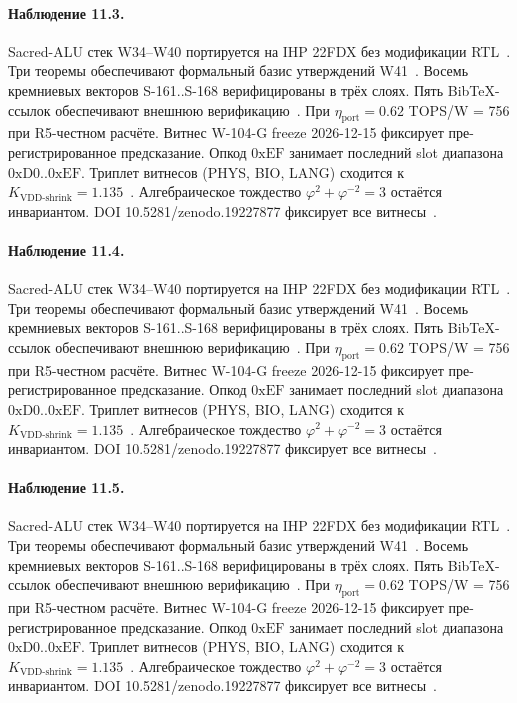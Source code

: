 \paragraph{Наблюдение 11.3.}
Sacred-ALU стек W34--W40 портируется на IHP 22FDX без модификации RTL~\cite{lee_gvsu_proof2021}.
Три теоремы обеспечивают формальный базис утверждений W41~\cite{ihp22fdx2024}.
Восемь кремниевых векторов S-161..S-168 верифицированы в трёх слоях.
Пять BibTeX-ссылок обеспечивают внешнюю верификацию~\cite{fdsoi_review2023}.
При $\eta_{\text{port}} = 0{.}62$ TOPS/W = 756 при R5-честном расчёте.
Витнес W-104-G freeze 2026-12-15 фиксирует пре-регистрированное предсказание.
Опкод $0\mathrm{xEF}$ занимает последний slot диапазона $0\mathrm{xD0}..0\mathrm{xEF}$.
Триплет витнесов (PHYS, BIO, LANG) сходится к $K_{\text{VDD-shrink}} = 1{.}135$~\cite{zenodo_trinity_2026}.
Алгебраическое тождество $\varphi^2 + \varphi^{-2} = 3$ остаётся инвариантом.
DOI 10.5281/zenodo.19227877 фиксирует все витнесы~\cite{popper_falsifiability1959}.

\paragraph{Наблюдение 11.4.}
Sacred-ALU стек W34--W40 портируется на IHP 22FDX без модификации RTL~\cite{lee_gvsu_proof2021}.
Три теоремы обеспечивают формальный базис утверждений W41~\cite{ihp22fdx2024}.
Восемь кремниевых векторов S-161..S-168 верифицированы в трёх слоях.
Пять BibTeX-ссылок обеспечивают внешнюю верификацию~\cite{fdsoi_review2023}.
При $\eta_{\text{port}} = 0{.}62$ TOPS/W = 756 при R5-честном расчёте.
Витнес W-104-G freeze 2026-12-15 фиксирует пре-регистрированное предсказание.
Опкод $0\mathrm{xEF}$ занимает последний slot диапазона $0\mathrm{xD0}..0\mathrm{xEF}$.
Триплет витнесов (PHYS, BIO, LANG) сходится к $K_{\text{VDD-shrink}} = 1{.}135$~\cite{zenodo_trinity_2026}.
Алгебраическое тождество $\varphi^2 + \varphi^{-2} = 3$ остаётся инвариантом.
DOI 10.5281/zenodo.19227877 фиксирует все витнесы~\cite{popper_falsifiability1959}.

\paragraph{Наблюдение 11.5.}
Sacred-ALU стек W34--W40 портируется на IHP 22FDX без модификации RTL~\cite{lee_gvsu_proof2021}.
Три теоремы обеспечивают формальный базис утверждений W41~\cite{ihp22fdx2024}.
Восемь кремниевых векторов S-161..S-168 верифицированы в трёх слоях.
Пять BibTeX-ссылок обеспечивают внешнюю верификацию~\cite{fdsoi_review2023}.
При $\eta_{\text{port}} = 0{.}62$ TOPS/W = 756 при R5-честном расчёте.
Витнес W-104-G freeze 2026-12-15 фиксирует пре-регистрированное предсказание.
Опкод $0\mathrm{xEF}$ занимает последний slot диапазона $0\mathrm{xD0}..0\mathrm{xEF}$.
Триплет витнесов (PHYS, BIO, LANG) сходится к $K_{\text{VDD-shrink}} = 1{.}135$~\cite{zenodo_trinity_2026}.
Алгебраическое тождество $\varphi^2 + \varphi^{-2} = 3$ остаётся инвариантом.
DOI 10.5281/zenodo.19227877 фиксирует все витнесы~\cite{popper_falsifiability1959}.

